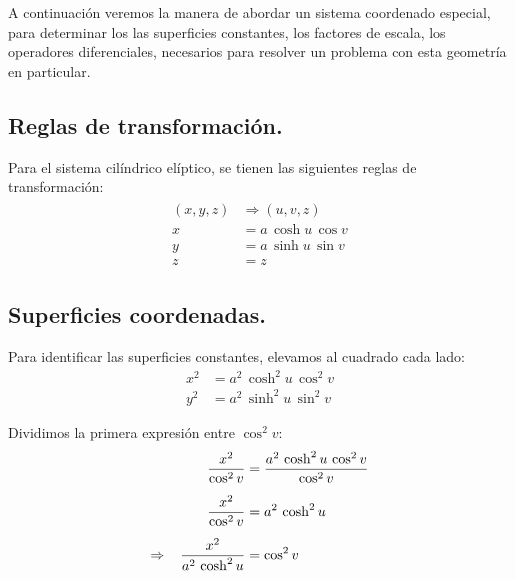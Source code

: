 \documentclass[12pt]{article}
\numberwithin{equation}{section}
\begin{document}
A continuación veremos la manera de abordar un sistema coordenado especial, para determinar los las superficies constantes, los factores de escala, los operadores diferenciales, necesarios para resolver un problema con esta geometría en particular.

\subsection{Reglas de transformación.}

Para el sistema cilíndrico elíptico, se tienen las siguientes reglas de transformación:
\begin{align}
\begin{aligned}
    (x, y, z) &\Rightarrow (u, v, z) \\
x &= a \, \cosh u \, \cos v \\
y &= a \, \sinh u \, \sin v \\
z &= z
\end{aligned}
\label{eq:ecuacion_02_73_esp}
\end{align}

\subsection{Superficies coordenadas.}

Para identificar las superficies constantes, elevamos al cuadrado cada lado:
\begin{align}
x^{2} &= a^{2} \, \cosh^{2} u \, \cos^{2} v \label{eq:ecuacion_02_74_esp} \\
y^{2} &= a^{2} \, \sinh^{2} u \, \sin^{2} v \label{eq:ecuacion_02_75_esp}
\end{align}

Dividimos la primera expresión entre $\cos^{2} v$:
\begin{align*}
\dfrac{x^{2}}{\cos^{2} v} &= \dfrac{a^{2} \, \cosh^{2} u \, \cos^{2} v}{\cos^{2} v} \\[0.5em]
\dfrac{x^{2}}{\cos^{2} v} &= a^{2} \, \cosh^{2} u \\[0.5em]
\Rightarrow \hspace{0.3cm} \dfrac{x^{2}}{a^{2} \, \cosh^{2} u} &= \cos^{2} v 
\end{align*}
\end{document}
